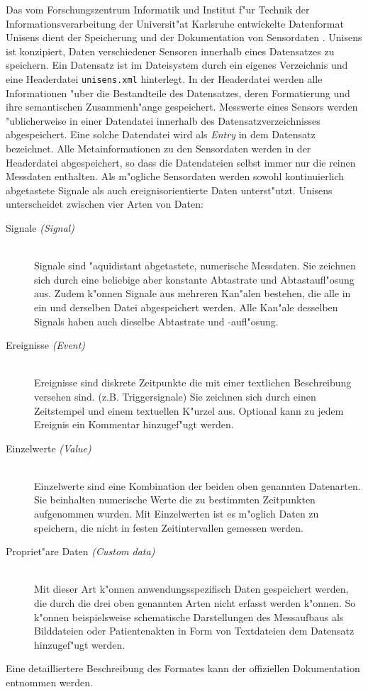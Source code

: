 Das vom Forschungszentrum Informatik und Institut f"ur Technik der Informationsverarbeitung der Universit"at Karlsruhe entwickelte Datenformat Unisens dient der Speicherung und der Dokumentation von Sensordaten \cite{Kirst2008, Ottenbacher2010}.
Unisens ist konzipiert, Daten verschiedener Sensoren innerhalb eines Datensatzes zu speichern.
Ein Datensatz ist im Dateisystem durch ein eigenes Verzeichnis und eine Headerdatei \verb|unisens.xml| hinterlegt.
In der Headerdatei werden alle Informationen "uber die Bestandteile des Datensatzes, deren Formatierung und ihre semantischen Zusammenh"ange gespeichert.
Messwerte eines Sensors werden "ublicherweise in einer Datendatei innerhalb des Datensatzverzeichnisses abgespeichert.
Eine solche Datendatei wird als \emph{Entry} in dem Datensatz bezeichnet.
Alle Metainformationen zu den Sensordaten werden in der Headerdatei abgespeichert, so dass die Datendateien selbst immer nur die reinen Messdaten enthalten.
Als m"ogliche Sensordaten werden sowohl kontinuierlich abgetastete Signale als auch ereignisorientierte Daten unterst"utzt.
Unisens unterscheidet zwischen vier Arten von Daten:
\begin{description}
	\item[Signale \emph{(Signal)}] \hfill \\
		Signale sind "aquidistant abgetastete, numerische Messdaten.
		Sie zeichnen sich durch eine beliebige aber konstante Abtastrate und Abtastaufl"osung aus.
		Zudem k"onnen Signale aus mehreren Kan"alen bestehen, die alle in ein und derselben Datei abgespeichert werden.
		Alle Kan"ale desselben Signals haben auch dieselbe Abtastrate und -aufl"osung.
	\item[Ereignisse \emph{(Event)}] \hfill \\
		Ereignisse sind diskrete Zeitpunkte die mit einer textlichen Beschreibung versehen sind. (z.B. Triggersignale)
		Sie zeichnen sich durch einen Zeitstempel und einem textuellen K"urzel aus.
		Optional kann zu jedem Ereignis ein Kommentar hinzugef"ugt werden.
	\item[Einzelwerte \emph{(Value)}] \hfill \\
		Einzelwerte sind eine Kombination der beiden oben genannten Datenarten.
		Sie beinhalten numerische Werte die zu bestimmten Zeitpunkten aufgenommen wurden.
		Mit Einzelwerten ist es m"oglich Daten zu speichern, die nicht in festen Zeitintervallen gemessen werden.
	\item[Propriet"are Daten \emph{(Custom data)}] \hfill \\
		Mit dieser Art k"onnen anwendungsspezifisch Daten gespeichert werden, die durch die drei oben genannten Arten nicht erfasst werden k"onnen.
		So k"onnen beispielsweise schematische Darstellungen des Messaufbaus als Bilddateien oder Patientenakten in Form von Textdateien dem Datensatz hinzugef"ugt werden.
\end{description}
Eine detailliertere Beschreibung des Formates kann der offiziellen Dokumentation \cite{Ottenbacher2010} entnommen werden.

